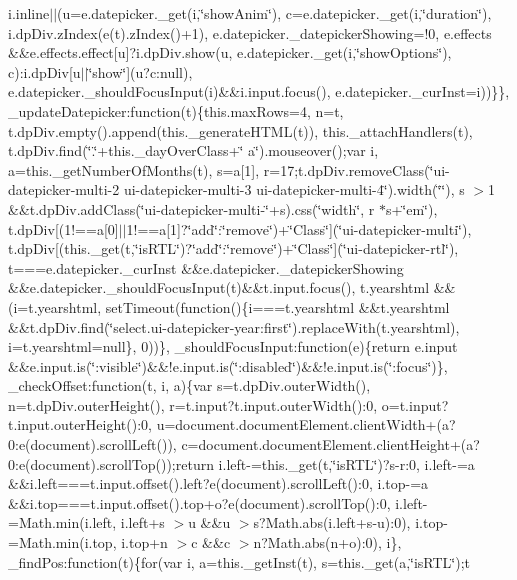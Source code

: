 \begin{DoxyCompactItemize}
i.\+inline$\vert$$\vert$(u=e.\+datepicker.\+\_\+get(i,\char`\"{}show\+Anim\char`\"{}), c=e.\+datepicker.\+\_\+get(i,\char`\"{}duration\char`\"{}), i.\+dp\+Div.\+z\+Index(e(t).\+z\+Index()+1), e.\+datepicker.\+\_\+datepicker\+Showing=!0, e.\+effects \&\&e.\+effects.\+effect\mbox{[}u\mbox{]}?i.\+dp\+Div.\+show(u, e.\+datepicker.\+\_\+get(i,\char`\"{}show\+Options\char`\"{}), c)\+:i.\+dp\+Div\mbox{[}u$\vert$$\vert$\char`\"{}show\char`\"{}\mbox{]}(u?c\+:null), e.\+datepicker.\+\_\+should\+Focus\+Input(i)\&\&i.\+input.\+focus(), e.\+datepicker.\+\_\+cur\+Inst=i))\}\}, \+\_\+update\+Datepicker\+:function(t)\{this.\+max\+Rows=4, n=t, t.\+dp\+Div.\+empty().\+append(this.\+\_\+generate\+H\+T\+M\+L(t)), this.\+\_\+attach\+Handlers(t), t.\+dp\+Div.\+find(\char`\"{}.\char`\"{}+this.\+\_\+day\+Over\+Class+\char`\"{} a\char`\"{}).\+mouseover();var i, a=this.\+\_\+get\+Number\+Of\+Months(t), s=a\mbox{[}1\mbox{]}, r=17;t.\+dp\+Div.\+remove\+Class(\char`\"{}ui-\/datepicker-\/multi-\/2 ui-\/datepicker-\/multi-\/3 ui-\/datepicker-\/multi-\/4\char`\"{}).\+width(\char`\"{}\char`\"{}), s $>$1 \&\&t.\+dp\+Div.\+add\+Class(\char`\"{}ui-\/datepicker-\/multi-\/\char`\"{}+s).\+css(\char`\"{}width\char`\"{}, r $\ast$s+\char`\"{}em\char`\"{}), t.\+dp\+Div\mbox{[}(1!==a\mbox{[}0\mbox{]}$\vert$$\vert$1!==a\mbox{[}1\mbox{]}?\char`\"{}add\char`\"{}\+:\char`\"{}remove\char`\"{})+\char`\"{}\+Class\char`\"{}\mbox{]}(\char`\"{}ui-\/datepicker-\/multi\char`\"{}), t.\+dp\+Div\mbox{[}(this.\+\_\+get(t,\char`\"{}is\+R\+T\+L\char`\"{})?\char`\"{}add\char`\"{}\+:\char`\"{}remove\char`\"{})+\char`\"{}\+Class\char`\"{}\mbox{]}(\char`\"{}ui-\/datepicker-\/rtl\char`\"{}), t===e.\+datepicker.\+\_\+cur\+Inst \&\&e.\+datepicker.\+\_\+datepicker\+Showing \&\&e.\+datepicker.\+\_\+should\+Focus\+Input(t)\&\&t.\+input.\+focus(), t.\+yearshtml \&\&(i=t.\+yearshtml, set\+Timeout(function()\{i===t.\+yearshtml \&\&t.\+yearshtml \&\&t.\+dp\+Div.\+find(\char`\"{}select.\+ui-\/datepicker-\/year\+:first\char`\"{}).\+replace\+With(t.\+yearshtml), i=t.\+yearshtml=null\}, 0))\}, \+\_\+should\+Focus\+Input\+:function(e)\{return e.\+input \&\&e.\+input.\+is(\char`\"{}\+:visible\char`\"{})\&\&!e.\+input.\+is(\char`\"{}\+:disabled\char`\"{})\&\&!e.\+input.\+is(\char`\"{}\+:focus\char`\"{})\}, \+\_\+check\+Offset\+:function(t, i, a)\{var s=t.\+dp\+Div.\+outer\+Width(), n=t.\+dp\+Div.\+outer\+Height(), r=t.\+input?t.\+input.\+outer\+Width()\+:0, o=t.\+input?t.\+input.\+outer\+Height()\+:0, u=document.\+document\+Element.\+client\+Width+(a?0\+:e(document).\+scroll\+Left()), c=document.\+document\+Element.\+client\+Height+(a?0\+:e(document).\+scroll\+Top());return i.\+left-\/=this.\+\_\+get(t,\char`\"{}is\+R\+T\+L\char`\"{})?s-\/r\+:0, i.\+left-\/=a \&\&i.\+left===t.\+input.\+offset().\+left?e(document).\+scroll\+Left()\+:0, i.\+top-\/=a \&\&i.\+top===t.\+input.\+offset().\+top+o?e(document).\+scroll\+Top()\+:0, i.\+left-\/=\+Math.\+min(i.\+left, i.\+left+s $>$u \&\&u $>$s?\+Math.\+abs(i.\+left+s-\/u)\+:0), i.\+top-\/=\+Math.\+min(i.\+top, i.\+top+n $>$c \&\&c $>$n?\+Math.\+abs(n+o)\+:0), i\}, \+\_\+find\+Pos\+:function(t)\{for(var i, a=this.\+\_\+get\+Inst(t), s=this.\+\_\+get(a,\char`\"{}is\+R\+T\+L\char`\"{});t 
\end{DoxyCompactItemize}
